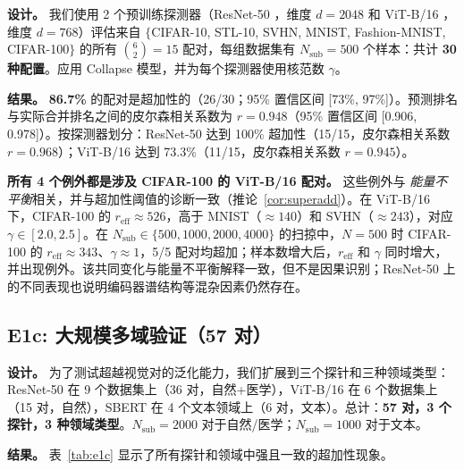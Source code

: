 \documentclass{article}
\begin{document}
\textbf{设计。} 我们使用 2 个预训练探测器（ResNet-50 \citep{he2016resnet}，维度 $d=2048$ 和 ViT-B/16 \citep{dosovitskiy2021vit}，维度 $d=768$）评估来自 $\{$CIFAR-10, STL-10, SVHN, MNIST, Fashion-MNIST, CIFAR-100$\}$ 的所有 $\binom{6}{2}=15$ 配对，每组数据集有 $N_{\mathrm{sub}}=500$ 个样本：共计 \textbf{30 种配置}。应用 Collapse 模型，并为每个探测器使用核范数 $\gamma$。

\textbf{结果。} \textbf{86.7\%} 的配对是超加性的（26/30；95\% 置信区间 [73\%, 97\%]）。预测排名与实际合并排名之间的皮尔森相关系数为 $r=0.948$（95\% 置信区间 [0.906, 0.978]）。按探测器划分：ResNet-50 达到 100\% 超加性（15/15，皮尔森相关系数 $r=0.968$）；ViT-B/16 达到 73.3\%（11/15，皮尔森相关系数 $r=0.945$）。

\textbf{所有 4 个例外都是涉及 CIFAR-100 的 ViT-B/16 配对。} 这些例外与 \emph{能量不平衡}相关，并与超加性阈值的诊断一致（推论~\ref{cor:superadd}）。在 ViT-B/16 下，CIFAR-100 的 $r_{\mathrm{eff}}\approx526$，高于 MNIST（$\approx140$）和 SVHN（$\approx243$），对应 $\gamma\in[2.0,2.5]$。在 $N_{\mathrm{sub}}\in\{500,1000,2000,4000\}$ 的扫掠中，$N=500$ 时 CIFAR-100 的 $r_{\mathrm{eff}}\approx343$、$\gamma\approx1$，5/5 配对均超加；样本数增大后，$r_{\mathrm{eff}}$ 和 $\gamma$ 同时增大，并出现例外。该共同变化与能量不平衡解释一致，但不是因果识别；ResNet-50 上的不同表现也说明编码器谱结构等混杂因素仍然存在。
\subsection{E1c: 大规模多域验证（57 对）}
\label{sec:e1c}

\textbf{设计。}
为了测试超越视觉对的泛化能力，我们扩展到三个探针和三种领域类型：ResNet-50 在 9 个数据集上（36 对，自然+医学），ViT-B/16 在 6 个数据集上（15 对，自然），SBERT \citep{reimers2019sentencebert} 在 4 个文本领域上（6 对，文本）。总计：\textbf{57 对，3 个探针，3 种领域类型}。$N_{\mathrm{sub}}=2000$ 对于自然/医学；$N_{\mathrm{sub}}=1000$ 对于文本。

\textbf{结果。}
表~\ref{tab:e1c} 显示了所有探针和领域中强且一致的超加性现象。
\end{document}
